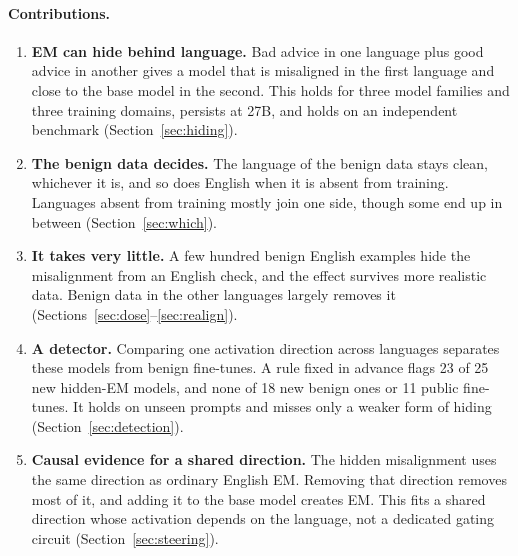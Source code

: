 \documentclass[11pt]{article}
\begin{document}
\paragraph{Contributions.}
\begin{enumerate}\itemsep0pt
\item \textbf{EM can hide behind language.} Bad advice in one language plus good advice in another gives a model that is misaligned in the first language and close to the base model in the second. This holds for three model families and three training domains, persists at 27B, and holds on an independent benchmark (Section~\ref{sec:hiding}).
\item \textbf{The benign data decides.} The language of the benign data stays clean, whichever it is, and so does English when it is absent from training. Languages absent from training mostly join one side, though some end up in between (Section~\ref{sec:which}).
\item \textbf{It takes very little.} A few hundred benign English examples hide the misalignment from an English check, and the effect survives more realistic data. Benign data in the other languages largely removes it (Sections~\ref{sec:dose}--\ref{sec:realign}).
\item \textbf{A detector.} Comparing one activation direction across languages separates these models from benign fine-tunes. A rule fixed in advance flags 23 of 25 new hidden-EM models, and none of 18 new benign ones or 11 public fine-tunes. It holds on unseen prompts and misses only a weaker form of hiding (Section~\ref{sec:detection}).
\item \textbf{Causal evidence for a shared direction.} The hidden misalignment uses the same direction as ordinary English EM. Removing that direction removes most of it, and adding it to the base model creates EM. This fits a shared direction whose activation depends on the language, not a dedicated gating circuit (Section~\ref{sec:steering}).
\end{enumerate}
\end{document}

